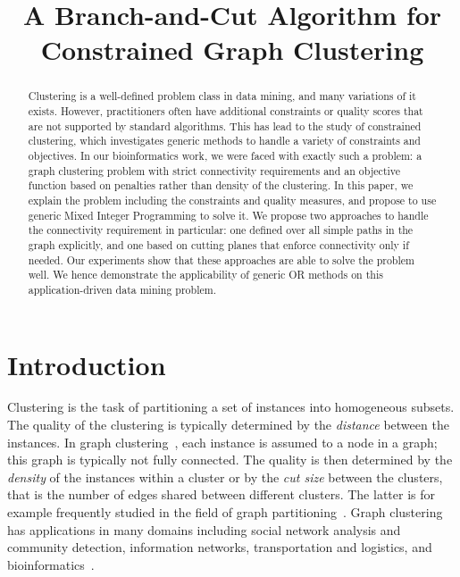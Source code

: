 \documentclass[conference]{IEEEtran}
\begin{document}
\title{A Branch-and-Cut Algorithm for Constrained Graph Clustering}

\author{
\and
{}
\and
{}
}

\maketitle

\begin{abstract}
Clustering is a well-defined problem class in data mining, and many variations of it exists. However, practitioners often have additional constraints or quality scores that are not supported by standard algorithms. This has lead to the study of constrained clustering, which investigates generic methods to handle a variety of constraints and objectives. In our bioinformatics work, we were faced with exactly such a problem: a graph clustering problem with strict connectivity requirements and an objective function based on penalties rather than density of the clustering. In this paper, we explain the problem including the constraints and quality measures, and propose to use generic Mixed Integer Programming to solve it. We propose two approaches to handle the connectivity requirement in particular: one defined over all simple paths in the graph explicitly, and one based on cutting planes that enforce connectivity only if needed. Our experiments show that these approaches are able to solve the problem well. We hence demonstrate the applicability of generic OR methods on this application-driven data mining problem.
\end{abstract}

\section{Introduction}
\label{introduction}

Clustering is the task of partitioning a set of instances into
homogeneous subsets. The quality of the clustering is typically determined by the \textit{distance} between the instances. In graph clustering~\cite{schaeffer2007graph}, each instance is assumed to a node in a graph; this graph is typically not fully connected. The quality is then determined by the \textit{density} of the instances within a cluster or by the \textit{cut size} between the clusters, that is the number of edges shared between different clusters. The latter is for example frequently studied in the field of graph partitioning~\cite{BulucMSS016}. Graph clustering has applications in many domains including social network analysis and community detection, information networks, transportation and logistics, and bioinformatics~\cite{schaeffer2007graph}.
\end{document}
